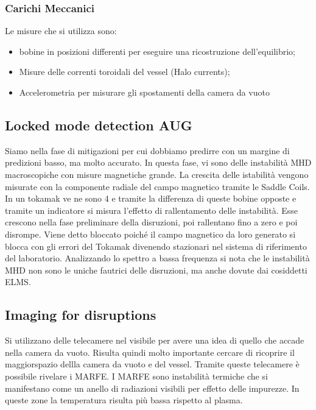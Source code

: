 \documentclass{article}
\begin{document}
\subsubsection{Carichi Meccanici}
Le misure che si utilizza sono:\begin{itemize}
	\item bobine in posizioni differenti per eseguire una ricostruzione dell'equilibrio;
	\item Misure delle correnti toroidali del vessel (Halo currents);
	\item Accelerometria per misurare gli spostamenti della camera da vuoto
\end{itemize}
\subsection{Locked mode detection AUG}
Siamo nella fase di mitigazioni per cui dobbiamo predirre con un margine di predizioni basso, ma molto accurato.\newline
In questa fase, vi sono delle instabilità MHD macroscopiche con misure magnetiche grande. La crescita delle istabilità vengono misurate con la componente radiale del campo magnetico tramite le Saddle Coils. In un tokamak ve ne sono 4 e tramite la differenza di queste bobine opposte e tramite un indicatore si misura l'effetto di rallentamento delle instabilità. Esse crescono nella fase preliminare della disruzioni, poi rallentano fino a zero e poi disrompe. Viene detto bloccato poiché il campo magnetico da loro generato si blocca con gli errori del Tokamak divenendo stazionari nel sistema di riferimento del laboratorio.\newline
Analizzando lo spettro a bassa frequenza si nota che le instabilità MHD non sono le uniche fautrici delle disruzioni, ma anche dovute dai cosiddetti ELMS.%
\subsection{Imaging for disruptions}
Si utilizzano delle telecamere nel visibile per avere una idea di quello che accade nella camera da vuoto. Risulta quindi molto importante cercare di ricoprire il maggiorspazio dellla camera da vuoto e del vessel. Tramite queste telecamere è possibile rivelare i MARFE.\newline
I MARFE sono instabilità termiche che si manifestano come un anello di radiazioni visibili per effetto delle impurezze. In queste zone la temperatura risulta più bassa rispetto al plasma.
\end{document}
